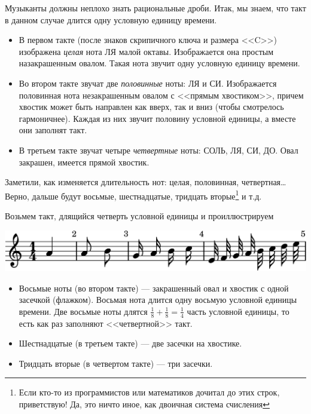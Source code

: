 Музыканты должны неплохо знать рациональные дроби. Итак, мы знаем, что такт в данном случае длится одну условную единицу времени.
\begin{itemize}
    \item В первом такте (после знаков скрипичного ключа и размера <<C>>) изображена \emph{целая} нота ЛЯ малой октавы. Изображается она простым назакрашенным овалом. Такая нота звучит одну условную единицу времени. 
    
    \item Во втором такте звучат две \emph{половинные} ноты: ЛЯ и СИ. Изображается половинная нота незакрашенным овалом с <<прямым хвостиком>>, причем хвостик может быть направлен как вверх, так и вниз (чтобы смотрелось гармоничнее). Каждая из них звучит половину условной единицы, а вместе они заполнят такт.
    
    \item В третьем такте звучат четыре \emph{четвертные} ноты: СОЛЬ, ЛЯ, СИ, ДО. Овал закрашен, имеется прямой хвостик.
\end{itemize}

Заметили, как изменяется длительность нот: целая, половинная, четвертная\ldots Верно, дальше будут восьмые, шестнадцатые, тридцать вторые\footnote{Если кто-то из программистов или математиков дочитал до этих строк, приветствую! Да, это ничто иное, как двоичная система счисления} и т.д.

Возьмем такт, длящийся четверть условной единицы и проиллюстрируем 
\begin{center}    
    \includegraphics{fig/notes/time-1-4-beam-off}
\end{center}

\begin{itemize}
    \item Восьмые ноты (во втором такте) --- закрашенный овал и хвостик с одной засечкой (флажком). Восьмая нота длится одну восьмую условной единицы времени. Две восьмые ноты длятся $\frac{1}{8} + \frac{1}{8} = \frac{1}{4}$ часть условной единицы, то есть как раз заполняют <<четвертной>> такт.
    \item Шестнадцатые (в третьем такте) --- две засечки на хвостике.
    \item Тридцать вторые (в четвертом такте) --- три засечки.
\end{itemize}


